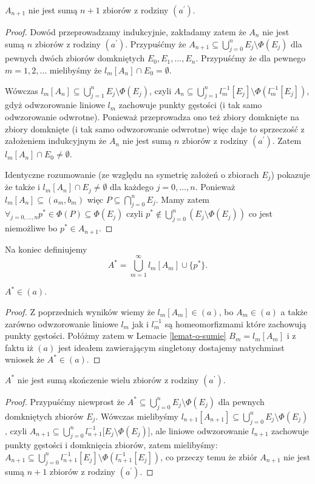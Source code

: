 \documentclass[12pt]{amsart}
\theoremstyle{plain}
\theoremstyle{definition}
\theoremstyle{remark}
\newcommand{\aideal}{\mathit{(a)}}
\newcommand{\aidealprime}{\mathit{(a^\prime)}}
\begin{document}
 $A_{n+1}$ nie jest sumą $n + 1$ zbiorów z rodziny $\aidealprime$.
\begin{proof}
Dowód przeprowadzamy indukcyjnie, zakładamy zatem że $A_n$ nie jest sumą
$n$ zbiorów z rodziny $\aidealprime$.
Przypuśćmy że $A_{n+1} \subseteq \bigcup_{j=0}^n E_j \setminus \Phi(E_j)$
dla pewnych dwóch zbiorów domkniętych $E_0, E_1, \ldots, E_n$.  Przypuśćmy że dla pewnego 
$m = 1,2,\ldots$ mielibyśmy że $l_m[A_n] \cap E_0 = \emptyset$.

Wówczas $l_m[A_n] \subseteq \bigcup_{j=1}^n E_j \setminus \Phi(E_j)$, czyli 
$A_n \subseteq \bigcup_{j=1}^n l_m^{-1}[E_j] \setminus \Phi(l_m^{-1}[E_j])$, gdyż
odwzorowanie liniowe $l_m$ zachowuje punkty gęstości (i tak samo odwzorowanie odwrotne). Ponieważ 
przeprowadza ono też zbiory domknięte na zbiory domknięte (i tak samo odwzorowanie odwrotne)
więc daje to sprzeczość z założeniem indukcyjnym że $A_n$ nie jest sumą $n$ zbiorów z rodziny $\aidealprime$.
Zatem $l_m[A_n] \cap E_0 \not= \emptyset$.

Identyczne rozumowanie (ze względu na symetrię założeń o zbiorach $E_j$)
pokazuje że także i $l_m[A_n] \cap E_j \not= \emptyset$
dla każdego $j = 0, \ldots, n$.
Ponieważ $l_m[A_n] \subseteq (a_m, b_m)$
więc $P \subseteq \bigcap_{j=0}^n E_j$. 
Mamy zatem $\forall_{j=0,\ldots, n} p^* \in \Phi(P) \subseteq \Phi(E_j)$
czyli $p^* \not\in \bigcup_{j=0}^n (E_j \setminus \Phi(E_j))$
co jest niemożliwe bo $p^* \in A_{n+1}$.
\end{proof}

Na koniec definiujemy 
\[ A^* = \bigcup_{m=1}^{\infty} l_m[A_m] \cup \lbrace p^* \rbrace.
\]

 $A^* \in \aideal$.
\begin{proof}
Z poprzednich wyników wiemy że $l_m[A_m] \in \aideal$, bo 
$A_m \in \aideal$ a także zarówno odwzorowanie liniowe $l_m$
jak i $l_m^{-1}$ są homeomorfizmami które zachowują punkty gęstości.
Połóżmy zatem w Lemacie \ref{lemat-o-sumie} 
$B_m = l_m[A_m]$ i z faktu iż $\aideal$ jest ideałem
zawierającym singletony dostajemy natychmiast wniosek
że $A^* \in \aideal$.
\end{proof}

 $A^*$ nie jest sumą skończenie
wielu zbiorów z rodziny $\aidealprime$.
\begin{proof}
Przypuśćmy niewprost że
$A^* \subseteq \bigcup_{j=0}^n E_j \setminus \Phi(E_j)$
dla pewnych domkniętych zbiorów $E_j$.
Wówczas mielibyśmy
$l_{n+1}[A_{n+1}] \subseteq \bigcup_{j=0}^n E_j \setminus \Phi(E_j)$,
czyli
$A_{n+1} \subseteq \bigcup_{j=0}^n l_{n+1}^{-1}\big[E_j \setminus \Phi(E_j)\big]$,
ale liniowe odwzorowanie $l_{n+1}$ zachowuje punkty gęstości i
domknięcia zbiorów, zatem mielibyśmy:
$A_{n+1} \subseteq \bigcup_{j=0}^n l_{n+1}^{-1}[E_j] \setminus
\Phi(l_{n+1}^{-1}[E_j])$, co przeczy temu że zbiór
$A_{n+1}$ nie jest sumą $n+1$ zbiorów z rodziny $\aidealprime$.
\end{proof}
\end{document}
